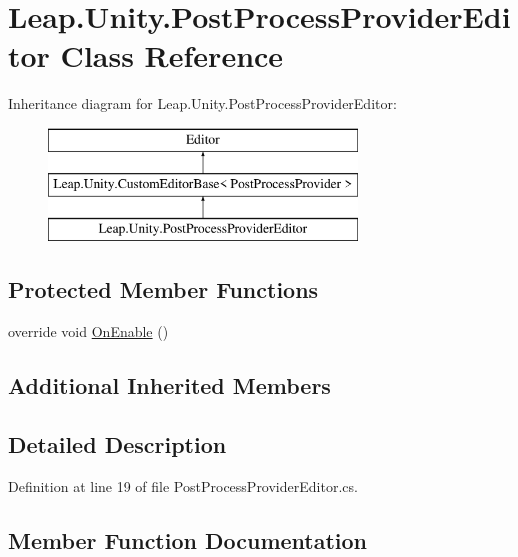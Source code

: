 \hypertarget{class_leap_1_1_unity_1_1_post_process_provider_editor}{}\section{Leap.\+Unity.\+Post\+Process\+Provider\+Editor Class Reference}
\label{class_leap_1_1_unity_1_1_post_process_provider_editor}
Inheritance diagram for Leap.\+Unity.\+Post\+Process\+Provider\+Editor\+:\begin{figure}[H]
\begin{center}
\leavevmode
\includegraphics[height=3.000000cm]{class_leap_1_1_unity_1_1_post_process_provider_editor}
\end{center}
\end{figure}
\subsection*{Protected Member Functions}
\begin{DoxyCompactItemize}
\item 
override void \mbox{\hyperlink{class_leap_1_1_unity_1_1_post_process_provider_editor_a0443446523e25734d3cace5773eab7a4}{On\+Enable}} ()
\end{DoxyCompactItemize}
\subsection*{Additional Inherited Members}


\subsection{Detailed Description}


Definition at line 19 of file Post\+Process\+Provider\+Editor.\+cs.



\subsection{Member Function Documentation}
\mbox{\label{class_leap_1_1_unity_1_1_post_process_provider_editor_a0443446523e25734d3cace5773eab7a4}} 
